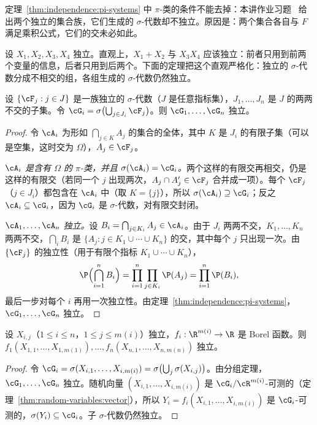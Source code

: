 \begin{remark}[为什么要求 $\pi$-类]
定理~\ref{thm:independence:pi-systems} 中 $\pi$-类的条件不能去掉：本讲作业习题~ 给出两个独立的集合族，它们生成的 $\sigma$-代数却不独立。原因是：两个集合各自与 $F$ 满足乘积公式，它们的交未必如此。
\end{remark}


设 $X_1,X_2,X_3,X_4$ 独立。直观上，$X_1+X_2$ 与 $X_3X_4$ 应该独立：前者只用到前两个变量的信息，后者只用到后两个。下面的定理把这个直观严格化：独立的 $\sigma$-代数分成不相交的组，各组生成的 $\sigma$-代数仍然独立。

\begin{theorem}[分组定理]\label{thm:independence:grouping}
设 $\{\cF_j:j\in J\}$ 是一族独立的 $\sigma$-代数（$J$ 是任意指标集），$J_1,\dots,J_n$ 是 $J$ 的两两不交的子集。令 $\cG_i=\sigma\bigl(\bigcup_{j\in J_i}\cF_j\bigr)$。则 $\cG_1,\dots,\cG_n$ 独立。
\end{theorem}
\begin{proof}
令 $\cA_i$ 为形如 $\bigcap_{j\in K}A_j$ 的集合的全体，其中 $K$ 是 $J_i$ 的有限子集（可以是空集，这时交为 $\Omega$），$A_j\in\cF_j$。

\emph{$\cA_i$ 是含有 $\Omega$ 的 $\pi$-类，并且 $\sigma(\cA_i)=\cG_i$。}两个这样的有限交再相交，仍是这样的有限交（若同一个 $j$ 出现两次，$A_j\cap A_j'\in\cF_j$ 合并成一项）。每个 $\cF_j$（$j\in J_i$）都包含在 $\cA_i$ 中（取 $K=\{j\}$），所以 $\sigma(\cA_i)\supseteq\cG_i$；反之 $\cA_i\subseteq\cG_i$，因为 $\cG_i$ 是 $\sigma$-代数，对有限交封闭。

\emph{$\cA_1,\dots,\cA_n$ 独立。}设 $B_i=\bigcap_{j\in K_i}A_j\in\cA_i$。由于 $J_i$ 两两不交，$K_1,\dots,K_n$ 两两不交，$\bigcap_iB_i$ 是 $\{A_j:j\in K_1\cup\cdots\cup K_n\}$ 的交，其中每个 $j$ 只出现一次。由 $\{\cF_j\}$ 的独立性（用于有限个指标 $K_1\cup\cdots\cup K_n$），
\[
\P\Bigl(\bigcap_{i=1}^nB_i\Bigr)=\prod_{i=1}^n\prod_{j\in K_i}\P(A_j)=\prod_{i=1}^n\P(B_i),
\]
最后一步对每个 $i$ 再用一次独立性。由定理~\ref{thm:independence:pi-systems}，$\cG_1,\dots,\cG_n$ 独立。
\end{proof}

\begin{corollary}[不交分组上的函数]\label{cor:independence:functions}
设 $X_{i,j}$（$1\leqslant i\leqslant n$，$1\leqslant j\leqslant m(i)$）独立，$f_i:\R^{m(i)}\to\R$ 是 Borel 函数。则 $f_1(X_{1,1},\dots,X_{1,m(1)}),\dots,f_n(X_{n,1},\dots,X_{n,m(n)})$ 独立。
\end{corollary}
\begin{proof}
令 $\cG_i=\sigma(X_{i,1},\dots,X_{i,m(i)})=\sigma\bigl(\bigcup_j\sigma(X_{i,j})\bigr)$。由分组定理，$\cG_1,\dots,\cG_n$ 独立。随机向量 $(X_{i,1},\dots,X_{i,m(i)})$ 是 $\cG_i/\cR^{m(i)}$-可测的（定理~\ref{thm:random-variables:vector}），所以 $Y_i=f_i(X_{i,1},\dots,X_{i,m(i)})$ 是 $\cG_i$-可测的，$\sigma(Y_i)\subseteq\cG_i$。子 $\sigma$-代数仍然独立。
\end{proof}

